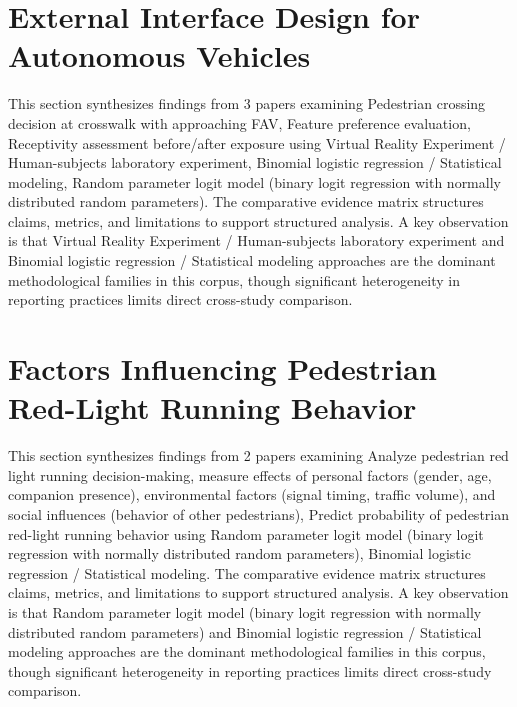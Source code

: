 \documentclass{article}
\begin{document}
\section{External Interface Design for Autonomous Vehicles}
This section synthesizes findings from 3 papers examining Pedestrian crossing decision at crosswalk with approaching FAV, Feature preference evaluation, Receptivity assessment before/after exposure using Virtual Reality Experiment / Human-subjects laboratory experiment, Binomial logistic regression / Statistical modeling, Random parameter logit model (binary logit regression with normally distributed random parameters). The comparative evidence matrix structures claims, metrics, and limitations to support structured analysis. A key observation is that Virtual Reality Experiment / Human-subjects laboratory experiment and Binomial logistic regression / Statistical modeling approaches are the dominant methodological families in this corpus, though significant heterogeneity in reporting practices limits direct cross-study comparison.

\section{Factors Influencing Pedestrian Red-Light Running Behavior}
This section synthesizes findings from 2 papers examining Analyze pedestrian red light running decision-making, measure effects of personal factors (gender, age, companion presence), environmental factors (signal timing, traffic volume), and social influences (behavior of other pedestrians), Predict probability of pedestrian red-light running behavior using Random parameter logit model (binary logit regression with normally distributed random parameters), Binomial logistic regression / Statistical modeling. The comparative evidence matrix structures claims, metrics, and limitations to support structured analysis. A key observation is that Random parameter logit model (binary logit regression with normally distributed random parameters) and Binomial logistic regression / Statistical modeling approaches are the dominant methodological families in this corpus, though significant heterogeneity in reporting practices limits direct cross-study comparison.
\end{document}
